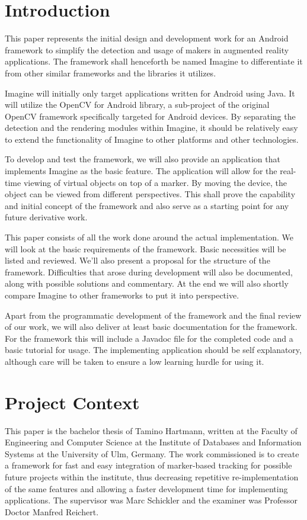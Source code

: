 \section{Introduction}

This paper represents the initial design and development work for an Android framework to simplify the detection and usage of makers in augmented reality applications.
The framework shall henceforth be named Imagine to differentiate it from other similar frameworks and the libraries it utilizes.

Imagine will initially only target applications written for Android\cite{android} using Java.
It will utilize the OpenCV for Android\cite{opencvandroid} library, a sub-project of the original OpenCV framework\cite{opencv} specifically targeted for Android devices.
By separating the detection and the rendering modules within Imagine, it should be relatively easy to extend the functionality of Imagine to other platforms and other technologies.

To develop and test the framework, we will also provide an application that implements Imagine as the basic feature.
The application will allow for the real-time viewing of virtual objects on top of a marker.
By moving the device, the object can be viewed from different perspectives.
This shall prove the capability and initial concept of the framework and also serve as a starting point for any future derivative work.

This paper consists of all the work done around the actual implementation.
We will look at the basic requirements of the framework.
Basic necessities will be listed and reviewed.
We'll also present a proposal for the structure of the framework.
Difficulties that arose during development will also be documented, along with possible solutions and commentary.
At the end we will also shortly compare Imagine to other frameworks to put it into perspective.

Apart from the programmatic development of the framework and the final review of our work, we will also deliver at least basic documentation for the framework.
For the framework this will include a Javadoc\cite{docjava} file for the completed code and a basic tutorial for usage.
The implementing application should be self explanatory, although care will be taken to ensure a low learning hurdle for using it.

\section{Project Context}

This paper is the bachelor thesis of Tamino Hartmann, written at the Faculty of Engineering and Computer Science\cite{faculty} at the Institute of Databases and Information Systems at the University of Ulm\cite{ulmuni}, Germany.
The work commissioned is to create a framework for fast and easy integration of marker-based tracking for possible future projects within the institute, thus decreasing repetitive re-implementation of the same features and allowing a faster development time for implementing applications.
The supervisor was Marc Schickler and the examiner was Professor Doctor Manfred Reichert.
